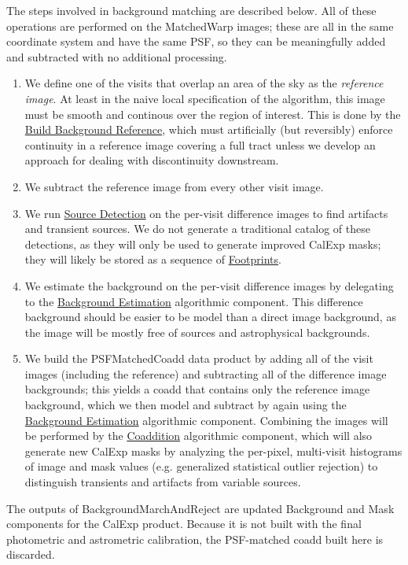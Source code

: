 The steps involved in background matching are described below.  All of these operations are performed on the MatchedWarp images; these are all in the same coordinate system and have the same PSF, so they can be meaningfully added and subtracted with no additional processing.
\begin{enumerate}
\item We define one of the visits that overlap an area of the sky as the \emph{reference image}.  At least in the naive local specification of the algorithm, this image must be smooth and continous over the region of interest.  This is done by the \hyperref[sec:acBuildBackgroundReference]{Build Background Reference}, which must artificially (but reversibly) enforce continuity in a reference image covering a full tract unless we develop an approach for dealing with discontinuity downstream.
\item We subtract the reference image from every other visit image.
\item We run \hyperref[sec:acSourceDetection]{Source Detection} on the per-visit difference images to find artifacts and transient sources.  We do not generate a traditional catalog of these detections, as they will only be used to generate improved CalExp masks; they will likely be stored as a sequence of \hyperref[sec:spFootprints]{Footprints}.
\item We estimate the background on the per-visit difference images by delegating to the \hyperref[sec:acBackgroundEstimation]{Background Estimation} algorithmic component.  This difference background should be easier to be model than a direct image background, as the image will be mostly free of sources and astrophysical backgrounds.
\item We build the PSFMatchedCoadd data product by adding all of the visit images (including the reference) and subtracting all of the difference image backgrounds; this yields a coadd that contains only the reference image background, which we then model and subtract by again using the \hyperref[sec:acBackgroundEstimation]{Background Estimation} algorithmic component.  Combining the images will be performed by the \hyperref[sec:acCoaddition]{Coaddition} algorithmic component, which will also generate new CalExp masks by analyzing the per-pixel, multi-visit histograms of image and mask values (e.g. generalized statistical outlier rejection) to distinguish transients and artifacts from variable sources.
\end{enumerate}

The outputs of BackgroundMarchAndReject are updated Background and Mask components for the CalExp product.  Because it is not built with the final photometric and astrometric calibration, the PSF-matched coadd built here is discarded.

